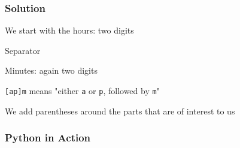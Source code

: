 \begin{frame}
  \frametitle{Solution}
  \begin{center} \ttfamily
  \end{center}
  \vskip5mm
  \vskip2mm
  \begin{overprint}
    \begin{center}
      We start with the hours: two digits
    \end{center}

    \begin{center}
      Separator
    \end{center}

    \begin{center}
      Minutes: again two digits
    \end{center}

    \begin{center}
      \texttt{[ap]m} means "either \texttt{a} or \texttt{p}, followed by \texttt{m}"
    \end{center}

    \begin{center}
      We add parentheses around the parts that are of interest to us
    \end{center}
  \end{overprint}
\end{frame}

\begin{frame}
  \frametitle{Python in Action}
\end{frame}